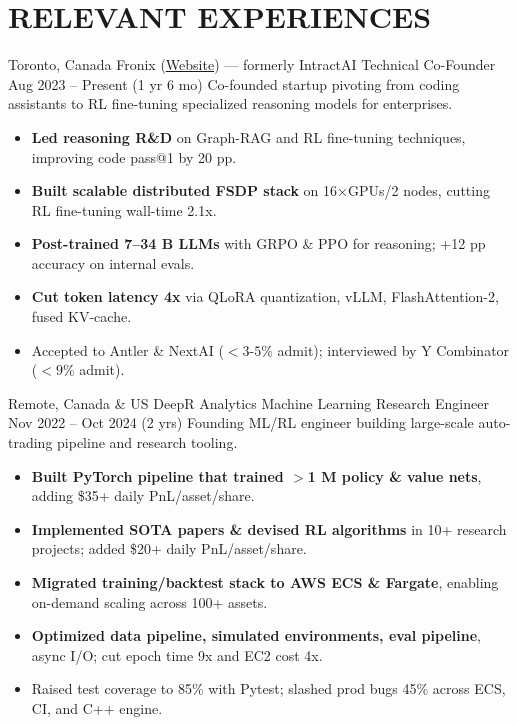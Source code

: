 \section{RELEVANT EXPERIENCES}

{\customcventry
    {Toronto, Canada}
    {Fronix (\href{https://fronix.net}{Website}) — formerly IntractAI}
    {Technical Co-Founder}
    {Aug 2023 – Present (1 yr 6 mo)}{}{}}
    Co-founded startup pivoting from coding assistants to RL fine-tuning specialized reasoning models for enterprises.
    \begin{itemize}
        \item \textbf{Led reasoning R\&D} on Graph-RAG and RL fine-tuning techniques, improving code pass@1 by 20 pp.
        \item \textbf{Built scalable distributed FSDP stack} on 16×GPUs/2 nodes, cutting RL fine-tuning wall-time 2.1x.
        \item \textbf{Post-trained 7–34 B LLMs} with GRPO \& PPO for reasoning; +12 pp accuracy on internal evals.
        \item \textbf{Cut token latency 4x} via QLoRA quantization, vLLM, FlashAttention-2, fused KV-cache.
        \item Accepted to Antler \& NextAI ($<$$3$-$5\%$ admit); interviewed by Y Combinator ($<$$9\%$ admit).
    \end{itemize}


{\customcventry
    {Remote, Canada \& US}
    {DeepR Analytics}
    {Machine Learning Research Engineer}
    {Nov 2022 – Oct 2024 (2 yrs)}{}{}}
    Founding ML/RL engineer building large-scale auto-trading pipeline and research tooling.

    \begin{itemize}
        \item \textbf{Built PyTorch pipeline that trained $>$1 M policy \& value nets}, adding \$35+ daily PnL/asset/share.
        \item \textbf{Implemented SOTA papers \& devised RL algorithms} in 10+ research projects; added \$20+ daily PnL/asset/share.
        \item \textbf{Migrated training/backtest stack to AWS ECS \& Fargate}, enabling on-demand scaling across 100+ assets.
        \item \textbf{Optimized data pipeline, simulated environments, eval pipeline}, async I/O; cut epoch time 9x and EC2 cost 4x.
        \item Raised test coverage to 85\% with Pytest; slashed prod bugs 45\% across ECS, CI, and C++ engine.
    \end{itemize}
  

